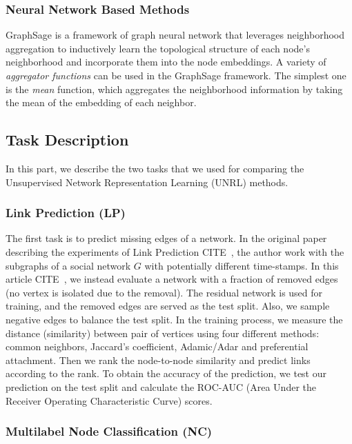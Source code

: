 \documentclass[a4paper]{article}
\newcommand{\citehere}{\textcolor[rgb]{1,0,0}{CITE\ }}
\begin{document}
\subsubsection{Neural Network Based Methods} %
GraphSage is a framework of graph neural network that leverages neighborhood aggregation to inductively learn the topological structure of each node's neighborhood and incorporate them into the node embeddings. A variety of \emph{aggregator functions} can be used in the GraphSage framework. The simplest one is the \textit{mean} function, which aggregates the neighborhood information by taking the mean of the embedding of each neighbor. 

\subsection{Task Description}

\noindent In this part, we describe the two tasks that we used for comparing the Unsupervised Network Representation Learning (UNRL) methods.

\subsubsection{Link Prediction (LP)}

\noindent The first task is to predict missing edges of a network. In the original paper describing the experiments of Link Prediction \citehere, the author work with the subgraphs of a social network $G$ with potentially different time-stamps. In this article \citehere, we instead evaluate a network with a fraction of removed edges (no vertex is isolated due to the removal). The residual network is used for training, and the removed edges are served as the test split. Also, we sample negative edges to balance the test split. In the training process, we measure the distance (similarity) between pair of vertices using four different methods: common neighbors, Jaccard's coefficient, Adamic/Adar and preferential attachment. Then we rank the node-to-node similarity and predict links according to the rank. To obtain the accuracy of the prediction, we test our prediction on the test split and calculate the ROC-AUC (Area Under the Receiver Operating Characteristic Curve) scores.

\subsubsection{Multilabel Node Classification (NC)}
\end{document}
